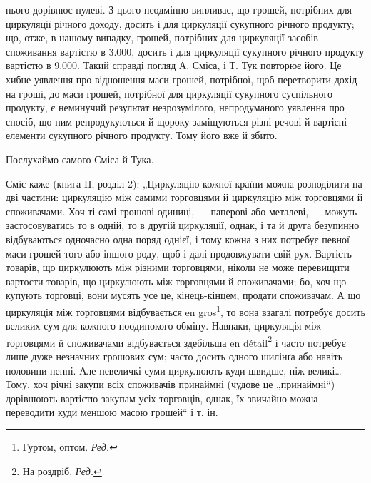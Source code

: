 \parcont{}  %
нього дорівнює нулеві. З цього неодмінно випливає, що грошей, потрібних
для циркуляції річного доходу, досить і для циркуляції сукупного
річного продукту; що, отже, в нашому випадку, грошей, потрібних для
циркуляції засобів споживання вартістю в 3.000, досить і для циркуляції
сукупного річного продукту вартістю в 9.000. Такий справді погляд
А. Сміса, і Т. Тук повторює його. Це хибне уявлення про відношення
маси грошей, потрібної, щоб перетворити дохід на гроші, до маси грошей,
потрібної для циркуляції сукупного суспільного продукту, є неминучий
результат незрозумілого, непродуманого уявлення про спосіб, що
ним репродукуються й щороку заміщуються різні речові й вартісні елементи
сукупного річного продукту. Тому його вже й збито.

Послухаймо самого Сміса й Тука.

Сміс каже (книга II, розділ 2): „Циркуляцію кожної країни можна
розподілити на дві частини: циркуляцію між самими торговцями й циркуляцію
між торговцями й споживачами. Хоч ті самі грошові одиниці, — паперові
або металеві, — можуть застосовуватись то в одній, то в другій
циркуляції, однак, і та й друга безупинно відбуваються одночасно одна поряд
однієї, і тому кожна з них потребує певної маси грошей того або
іншого роду, щоб і далі продовжувати свій рух. Вартість товарів, що циркулюють
між різними торговцями, ніколи не може перевищити вартости
товарів, що циркулюють між торговцями й споживачами; бо, хоч що купують
торговці, вони мусять усе це, кінець-кінцем, продати споживачам.
А що циркуляція між торговцями відбувається en gros\footnote*{
Гуртом, оптом. \emph{Ред.}
}, то вона взагалі потребує
досить великих сум для кожного поодинокого обміну. Навпаки, циркуляція
між торговцями й споживачами відбувається здебільша en détail\footnote*{
На роздріб. \emph{Ред.}
}
і часто потребує лише дуже незначних грошових сум; часто досить одного
шилінґа або навіть половини пенні. Але невеличкі суми циркулюють
куди швидше, ніж великі\dots{} Тому, хоч річні закупи всіх споживачів принаймні
(чудове це „принаймні“) дорівнюють вартістю закупам усіх
торговців, однак, їх звичайно можна переводити куди меншою масою
грошей“ і т. ін.

